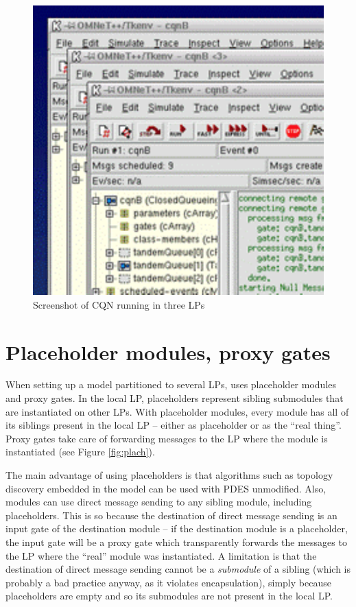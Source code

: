 \begin{figure}[htbp]
  \begin{center}
    \includegraphics{figures/parsim-screenshot}
    \caption{Screenshot of CQN running in three LPs}
    \label{fig:parsim-screenshot}
  \end{center}
\end{figure}



\section{Placeholder modules, proxy gates}

When setting up a model partitioned to several LPs,
{\opp} uses placeholder modules and proxy gates.
In the local LP, placeholders represent sibling submodules
that are instantiated on other LPs.
With placeholder modules, every module has all of its siblings
present in the local LP -- either as placeholder or as the ``real thing''.
Proxy gates take care of forwarding messages to the LP where
the module is instantiated (see Figure \ref{fig:plach}).

The main advantage of using placeholders is that algorithms such as
topology discovery embedded in the model can be used with PDES unmodified.
Also, modules can use direct message sending to any sibling module,
including placeholders. This is so because the destination of direct message
sending is an input gate of the destination module -- if the destination
module is a placeholder, the input gate will be a proxy gate which
transparently forwards the messages to the LP where the ``real'' module
was instantiated. A limitation is that the destination of direct message
sending cannot be a \textit{submodule} of a sibling (which is
probably a bad practice anyway, as it violates encapsulation),
simply because placeholders are empty and so its submodules are
not present in the local LP.

